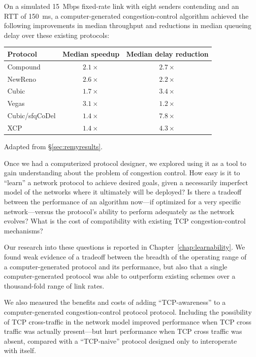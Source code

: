 On a simulated 15~Mbps fixed-rate link with eight senders contending and
an RTT of 150~ms, a computer-generated congestion-control algorithm
achieved the following improvements in median throughput and
reductions in median queueing delay over these existing protocols:

\begin{center}

\begin{tabular}{|l|c|c|}
\hline
Protocol & Median speedup & Median delay reduction \\
\hline
\hline
Compound & $2.1\times$ & $2.7\times$ \\
NewReno & $2.6\times$ & $2.2\times$ \\
Cubic & $1.7\times$ & $3.4\times$ \\
Vegas & $3.1\times$ & $1.2\times$ \\
\hline
Cubic/sfqCoDel & $1.4\times$ & $7.8\times$ \\
XCP & $1.4\times$ & $4.3\times$ \\
\hline
\end{tabular}

{\footnotesize Adapted from \S\ref{sec:remyresults}.}

\end{center}

Once we had a computerized protocol designer, we explored using it as
a tool to gain understanding about the problem of congestion control.
How easy is it to ``learn'' a network protocol to achieve desired
goals, given a necessarily imperfect model of the networks where it
ultimately will be deployed? Is there a tradeoff between the
performance of an algorithm now---if optimized for a very specific
network---versus the protocol's ability to perform adequately as the
network evolves? What is the cost of compatibility with existing TCP
congestion-control mechanisms?

Our research into these questions is reported in
Chapter~\ref{chap:learnability}. We found weak evidence of a tradeoff
between the breadth of the operating range of a computer-generated
protocol and its performance, but also that a single
computer-generated protocol was able to outperform existing schemes
over a thousand-fold range of link rates.

We also measured the benefits and costs of adding ``TCP-awareness'' to
a computer-generated congestion-control protocol protocol. Including
the possibility of TCP cross-traffic in the network model improved
performance when TCP cross traffic was actually present---but hurt
performance when TCP cross traffic was absent, compared with a
``TCP-naive'' protocol designed only to interoperate with itself.

